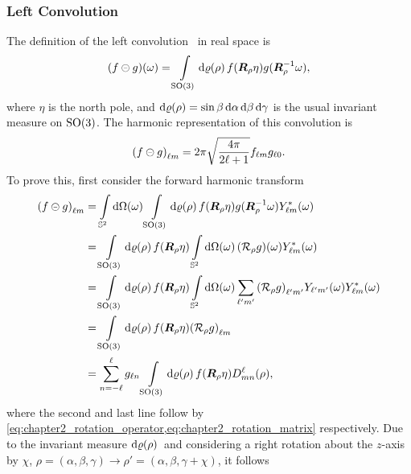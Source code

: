 \subsubsection{Left Convolution}

The definition of the left convolution~\cite{Kennedy2011,Driscoll1994} in real space is
%
\begin{equation}
    \pixel{(f \circleddash g)}
    = \integrateRotation{\rho} f(\rotationMatrix\eta) g(\rotationMatrix^{-1}\omega),
\end{equation}
%
where \({\eta}\) is the north pole, and \(\rotationVolume=\sin{\beta} \dd{\alpha} \dd{\beta} \dd{\gamma}\) is the usual invariant measure on \(\rotationGroup{}\).
The harmonic representation of this convolution is
%
\begin{equation}
    \harmonic{(f \circleddash g)}
    = 2\pi \sqrt{\inverseFactor} \harmonic{f} \axiHarmonic{g}.
\end{equation}
%
To prove this, first consider the forward harmonic transform
%
\begin{align}
    \harmonic{(f \circleddash g)}
     & = \integrateSphere{\omega} \integrateRotation{\rho} f(\rotationMatrix\eta) g(\rotationMatrix^{-1}\omega) \pixel{\conj{\harmonic{Y}}} \nonumber{}                                            \\
     & = \integrateRotation{\rho} f(\rotationMatrix\eta) \integrateSphere{\omega} \pixel{(\rotation{\rho}g)} \pixel{\conj{\harmonic{Y}}} \nonumber{}                                               \\
     & = \integrateRotation{\rho} f(\rotationMatrix\eta) \integrateSphere{\omega} \harmonicSum['] \harmonic[']{(\rotation{\rho}g)} \pixel{\harmonic[']{Y}} \pixel{\conj{\harmonic{Y}}} \nonumber{} \\
     & = \integrateRotation{\rho} f(\rotationMatrix\eta) \harmonic{(\rotation{\rho}g)} \nonumber{}                                                                                                 \\
     & = \wignerSum g_{\ell n} \integrateRotation{\rho} f(\rotationMatrix\eta) \wigner{\ell}{m}{n}(\rho),
\end{align}
%
where the second and last line follow by \cref{eq:chapter2_rotation_operator,eq:chapter2_rotation_matrix} respectively.
Due to the invariant measure \(\rotationVolume{}\) and considering a right rotation about the \(z\)-axis by \({\chi}\), \ie{} \(\rho = (\alpha,\beta,\gamma) \rightarrow \rho' = (\alpha,\beta,\gamma+\chi)\), it follows
